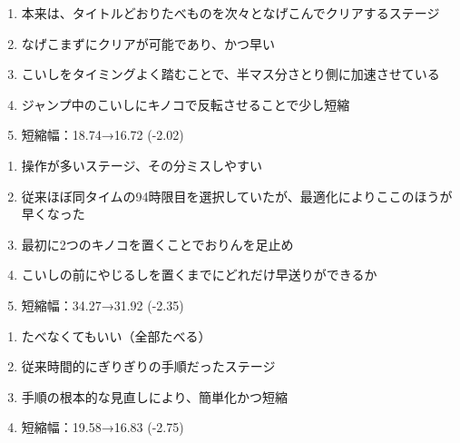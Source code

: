 \begin{enumerate}[label={\sarrow}]
\item 本来は、タイトルどおりたべものを次々となげこんでクリアするステージ
\item なげこまずにクリアが可能であり、かつ早い
\item こいしをタイミングよく踏むことで、半マス分さとり側に加速させている
\item ジャンプ中のこいしにキノコで反転させることで少し短縮
\item 短縮幅：18.74→16.72 (-2.02)
\end{enumerate}



\clearpage
\begin{enumerate}[label={\sarrow}]
\item 操作が多いステージ、その分ミスしやすい
\item 従来ほぼ同タイムの94時限目を選択していたが、最適化によりここのほうが早くなった
\item 最初に2つのキノコを置くことでおりんを足止め
\item こいしの前にやじるしを置くまでにどれだけ早送りができるか
\item 短縮幅：34.27→31.92 (-2.35)
\end{enumerate}



\begin{enumerate}[label={\sarrow}]
\item たべなくてもいい（全部たべる）
\item 従来時間的にぎりぎりの手順だったステージ
\item 手順の根本的な見直しにより、簡単化かつ短縮
\item 短縮幅：19.58→16.83 (-2.75)
\end{enumerate}



